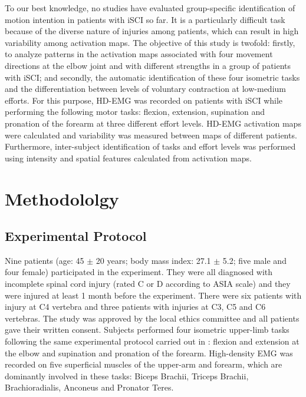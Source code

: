 To our best knowledge, no studies have evaluated group-specific identification of motion intention in patients with iSCI so far. It is a particularly difficult task because of the diverse nature of injuries among patients, which can result in high variability among activation maps. The objective of this study is twofold: firstly, to analyze patterns in the activation maps associated with four movement directions at the elbow joint and with different strengths in a group of patients with iSCI; and secondly, the automatic identification of these four isometric tasks and the differentiation between levels of voluntary contraction at low-medium efforts. For this purpose, HD-EMG was recorded on patients with iSCI while performing the following motor tasks: flexion, extension, supination and pronation of the forearm at three different effort levels. HD-EMG activation maps were calculated and variability was measured between maps of different patients. Furthermore, inter-subject identification of tasks and effort levels was performed using intensity and spatial features calculated from activation maps. 
\\
\clearpage

\section{Methodololgy}

\subsection*{Experimental Protocol}

Nine patients (age: 45 $\pm$ 20 years; body mass index: 27.1 $\pm$ 5.2; five male and four female) participated in the experiment. 
They were all diagnosed with incomplete spinal cord injury (rated C or D according to ASIA scale) and they were injured at least 1 month before the experiment. There were six patients with injury at C4 vertebra and three patients with injuries at C3, C5 and C6 vertebras. The study was approved by the local ethics committee and all patients gave their written consent.
Subjects performed four isometric upper-limb tasks following the same experimental protocol carried out in \citep{Rojas-Martinez2013}: flexion and extension at the elbow and supination and pronation of the forearm. High-density EMG was recorded on five superficial muscles of the upper-arm and forearm, which are dominantly involved in these tasks: Biceps Brachii, Triceps Brachii, Brachioradialis, Anconeus and Pronator Teres.

